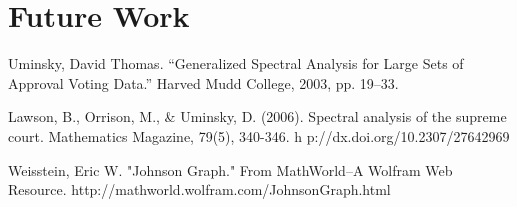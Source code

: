 \documentclass{article}
\theoremstyle{remark}
\theoremstyle{definition}
\begin{document}
\section{Future Work}


\begin{thebibliography}{}
    Uminsky, David Thomas. “Generalized Spectral Analysis for Large Sets of Approval Voting Data.” Harved Mudd College, 2003, pp. 19–33.

     Lawson, B., Orrison, M., & Uminsky, D. (2006). Spectral analysis of the supreme court. Mathematics Magazine, 79(5), 340-346. h p://dx.doi.org/10.2307/27642969
    
     Weisstein, Eric W. "Johnson Graph." From MathWorld--A Wolfram Web Resource. http://mathworld.wolfram.com/JohnsonGraph.html

\end{thebibliography}
\end{document}
